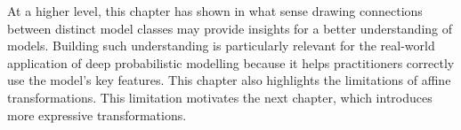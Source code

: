 At a higher level, this chapter has shown in what sense drawing connections between distinct model classes may provide insights for a better understanding of models. Building such understanding is particularly relevant for the real-world application of deep probabilistic modelling because it helps practitioners correctly use the model's key features. This chapter also highlights the limitations of affine transformations. This limitation motivates the next chapter, which introduces more expressive transformations.
%
